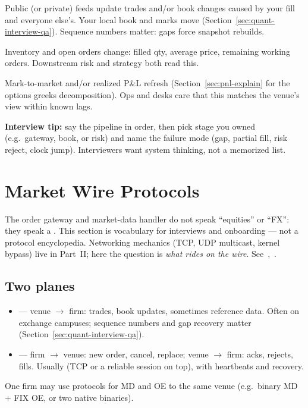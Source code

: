 Public (or private) feeds update trades and/or book changes caused by your fill 
and everyone else's. Your local book and marks move 
(Section~\ref{sec:quant-interview-qa}). Sequence numbers matter: gaps force 
snapshot rebuilds.

Inventory and open orders change: filled qty, average price, remaining working 
orders. Downstream risk and strategy both read this.

Mark-to-market and/or realized P\&L refresh (Section~\ref{sec:pnl-explain} for the 
options greeks decomposition). Ops and desks care that this matches the venue's 
view within known lags.

\par\noindent\textbf{Interview tip:} say the pipeline in order, then pick 
 stage you owned (e.g.\ gateway, book, or risk) and name the 
failure mode (gap, partial fill, risk reject, clock jump). Interviewers want 
system thinking, not a memorized list.

\section{Market Wire Protocols}
\label{sec:market-wire-protocols}
The order gateway and market-data handler do not speak ``equities'' or ``FX'': 
they speak a . This section is vocabulary 
for interviews and onboarding --- not a protocol encyclopedia. Networking 
mechanics (TCP, UDP multicast, kernel bypass) live in Part~II; here the question 
is \emph{what rides on the wire}. See~\cite{wiki-fix},~\cite{fixtrading-fix}.

\subsection{Two planes}
\label{subsec:protocol-two-planes}
\begin{itemize}
    \item {} --- venue $\rightarrow$ firm: trades, book 
          updates, sometimes reference data. Often  on 
          exchange campuses; sequence numbers and gap recovery matter 
          (Section~\ref{sec:quant-interview-qa}).
    \item {} --- firm $\rightarrow$ venue: new order, 
          cancel, replace; venue $\rightarrow$ firm: acks, rejects, fills. Usually 
           (TCP or a reliable session on top), with heartbeats 
          and recovery.
\end{itemize}
One firm may use  protocols for MD and OE to the same venue 
(e.g.\ binary MD + FIX OE, or two native binaries).

